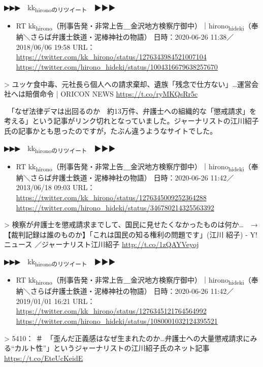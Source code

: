 \documentclass[]{ltjarticle}
\begin{document}
▶▶▶　kk\textsubscript{hironoのリツイート}　▶▶▶  

\begin{itemize}
\item RT kk\textsubscript{hirono}（刑事告発・非常上告＿金沢地方検察庁御中）｜hirono\textsubscript{hideki}（奉納＼さらば弁護士鉄道・泥棒神社の物語） 日時：2020-06-26 11:38／2018/06/06 19:58 URL： \url{https://twitter.com/kk\_hirono/status/1276343984521007104} \url{https://twitter.com/hirono\_hideki/status/1004316679638257670}
\end{itemize}

> ユッケ食中毒、元社長ら個人への請求棄却、遺族「残念で仕方ない」…運営会社へは賠償命令 | ORICON NEWS \url{https://t.co/ryMKQsRr5c}  

　「なぜ法律デマは出回るのか　約13万件、弁護士への組織的な「懲戒請求」を考える」という記事がリンク切れとなっていました。ジャーナリストの江川紹子氏の記事かとも思ったのですが，たぶん違うようなサイトでした。

▶▶▶　kk\textsubscript{hironoのリツイート}　▶▶▶  

\begin{itemize}
\item RT kk\textsubscript{hirono}（刑事告発・非常上告＿金沢地方検察庁御中）｜hirono\textsubscript{hideki}（奉納＼さらば弁護士鉄道・泥棒神社の物語） 日時：2020-06-26 11:42／2013/06/18 09:03 URL： \url{https://twitter.com/kk\_hirono/status/1276345009252364288} \url{https://twitter.com/hirono\_hideki/status/346780214325563392}
\end{itemize}

> 検察が弁護士を懲戒請求までして、国民に見せたくなかったものは何か…　→【裁判記録は誰のものか】「これは国民の知る権利の問題です」(江川 紹子) - Y!ニュース ／ジャーナリスト江川紹子 \url{http://t.co/1zQAYVeyoj}  

▶▶▶　kk\textsubscript{hironoのリツイート}　▶▶▶  

\begin{itemize}
\item RT kk\textsubscript{hirono}（刑事告発・非常上告＿金沢地方検察庁御中）｜hirono\textsubscript{hideki}（奉納＼さらば弁護士鉄道・泥棒神社の物語） 日時：2020-06-26 11:42／2019/01/01 16:21 URL： \url{https://twitter.com/kk\_hirono/status/1276345121764564992} \url{https://twitter.com/hirono\_hideki/status/1080001032124395521}
\end{itemize}

> 5410： ＃　「歪んだ正義感はなぜ生まれたのか…弁護士への大量懲戒請求にみる“カルト性”」というジャーナリストの江川紹子氏のネット記事 \url{https://t.co/EteUcKeidE}  
\end{document}
